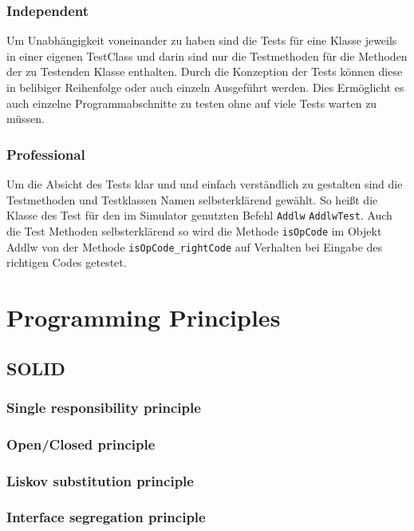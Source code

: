 \documentclass[12pt,a4paper,titlepage,ngerman,pdftex]{report}
\begin{document}
    \subsubsection{Independent}
	Um Unabhängigkeit voneinander zu haben sind die Tests für eine Klasse jeweils in einer eigenen TestClass und darin sind nur die Testmethoden für die Methoden der zu Testenden Klasse enthalten.
 	Durch die Konzeption der Tests können diese in belibiger Reihenfolge oder auch einzeln Ausgeführt werden. 
 	Dies Ermöglicht es auch einzelne Programmabschnitte zu testen ohne auf viele Tests warten zu müssen.
    \subsubsection{Professional}
    Um die Absicht des Tests klar und und einfach verständlich zu gestalten sind die Testmethoden und Testklassen Namen selbsterklärend gewählt. 
    So heißt die Klasse des Test für den im Simulator genutzten Befehl \verb|Addlw|  \verb|AddlwTest|.
    Auch die Test Methoden selbsterklärend so wird die Methode \verb|isOpCode| im Objekt Addlw von der Methode \verb|isOpCode_rightCode| auf Verhalten bei Eingabe des richtigen Codes getestet.

    \section{Programming Principles}

    \subsection{SOLID}
    
    \subsubsection{Single responsibility principle}

    \subsubsection{Open/Closed principle}

    \subsubsection{Liskov substitution principle}

    \subsubsection{Interface segregation principle}
\end{document}
